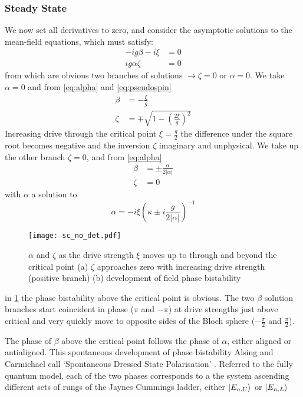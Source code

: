 \subsubsection{Steady State}
We now set all derivatives to zero, and consider the asymptotic solutions to the mean-field equations, which must satisfy:
\begin{align}
  -ig \beta -i \xi &= 0 \\
  ig\alpha \zeta &= 0
\end{align}
from which are obvious two branches of solutions $\rightarrow \zeta = 0$ or $\alpha = 0$. We take $\alpha = 0$ and from \cref{eq:alpha} and \cref{eq:pseudospin}
\begin{align}
  \beta &= -\frac{\xi}{g} \\
  \zeta &= \mp \sqrt{1 - {\left( \frac{2\xi}{g} \right)}^2}
\end{align}
Increasing drive through the critical point $\xi = \frac{g}{2}$ the difference under the square root becomes negative and the inversion $\zeta$ imaginary and unphysical. We take up the other branch $\zeta = 0$, and from \cref{eq:alpha}
\begin{align}
  \beta &= \pm \frac{\alpha}{2|\alpha|} \\
  \zeta &= 0
\end{align}
with $\alpha$ a solution to
\begin{equation}
  \alpha = -i \xi{\left ( \kappa \pm i \frac{g}{2|\alpha|} \right )}^{-1}
  \label{eq:alphacondnotdet}
\end{equation}
\begin{figure}[ht]
  \texttt{[image: sc\_no\_det.pdf]}
  \caption{$\alpha$ and $\zeta$ as the drive strength $\xi$ moves up to through and beyond the critical point (a) $\zeta$ approaches zero with increasing drive strength (positive branch)\label{fig:zeta} (b) development of field phase bistability}\label{fig:alpha}
  \label{fig:sc_no_det}
\end{figure}
in \cref{fig:sc_no_det} the phase bistability above the critical point is obvious. The two $\beta$ solution branches start coincident in phase ($\pi$ and $-\pi$) at drive strengths just above critical and very quickly move to opposite sides of the Bloch sphere ($-\frac{\pi}{2}$ and $\frac{\pi}{2}$).

The phase of $\beta$ above the critical point follows the phase of $\alpha$, either aligned or antialigned. This spontaneous development of phase bistability Alsing and Carmichael call `Spontaneous Dressed State Polarisation' \cite{Alsing1990}. Referred to the fully quantum model, each of the two phases corresponds to a the system ascending different sets of rungs of the Jaynes Cummings ladder, either $\ket{E_{n, U}}$ or $\ket{E_{n, L}}$
